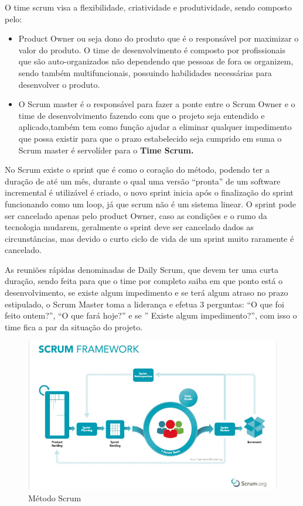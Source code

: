 \documentclass[
	12pt,				%
	oneside,			%
	a4paper,			%
  section=TITLE,
	brazil,				%
	]{abntex2}
\begin{document}
O time scrum visa a flexibilidade, criatividade e produtividade, sendo composto
pelo:

\begin{itemize}
  \item{Product Owner} ou seja dono do produto que é o responsável por
    maximizar o valor do produto. O time de desenvolvimento é composto por profissionais
    que são auto-organizados não dependendo que pessoas de fora os organizem, sendo
    também multifuncionais, possuindo habilidades necessárias para desenvolver o
    produto.
  \item{O Scrum master} é o responsável para fazer a ponte entre o Scrum
    Owner e o time de desenvolvimento fazendo com que o projeto seja entendido
    e aplicado,também tem como função ajudar a eliminar qualquer impedimento
    que possa existir para que o prazo estabelecido seja cumprido em suma o
    Scrum master é servolíder para o \bfseries{Time Scrum}.
\end{itemize}

No Scrum existe o sprint que é como o coração do método, podendo ter a duração
de até um mês, durante o qual uma versão “pronta” de um software incremental é
utilizável é criado, o novo sprint inicia após o finalização do sprint
funcionando como um loop, já que scrum não é um sistema linear. O sprint pode
ser cancelado apenas pelo product Owner, caso as condições e o rumo da
tecnologia mudarem, geralmente o sprint deve ser cancelado dados as
circunstâncias, mas devido o curto ciclo de vida de um sprint muito raramente é
cancelado.

As reuniões rápidas denominadas de Daily Scrum, que devem ter uma curta
duração, sendo feita para que o time por completo saiba em que ponto está o
desenvolvimento, se existe algum impedimento e se terá algum atraso no prazo
estipulado, o Scrum Master toma a liderança e efetua 3 perguntas: “O que foi
feito ontem?”, “O que fará hoje?” e se ” Existe algum impedimento?”, com isso o
time fica a par da situação do projeto.

\begin{figure}[htb]
\caption{\label{fig_circulo}Método Scrum}
\begin{center}
\includegraphics[scale=0.45]{img/scrum.png}
\end{center}
\end{figure}
\end{document}
